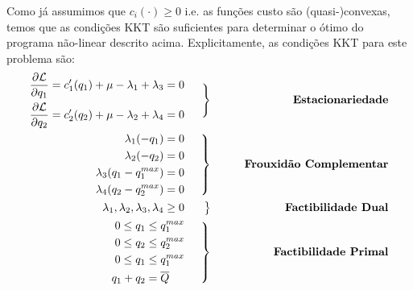 Como já assumimos que $c_i(\cdot)\ge0$ i.e. as funções custo são (quasi-)convexas, temos que as condições KKT são suficientes para determinar o ótimo do programa não-linear descrito acima. Explicitamente, as condições KKT para este problema são:
\begin{align*}
    \begin{aligned}
        \frac{\partial\mathcal{L}}{\partial q_1} &= c_1'(q_1) + \mu - \lambda_1 + \lambda_3 = 0\\
        \frac{\partial\mathcal{L}}{\partial q_2} &= c_2'(q_2) + \mu - \lambda_2 + \lambda_4 =0 
        \end{aligned} &&
        \left. \begin{aligned}
           \text{ }\\
           \text{ }
        \end{aligned}  \right\rbrace && \qquad \text{\textbf{Estacionariedade}}\\
        \begin{aligned}
            \lambda_1 (-q_1)&=0 \\
            \lambda_2 (-q_2)&=0 \\
            \lambda_3(q_1-q_1^{max})&=0\\
            \lambda_4(q_2-q_2^{max})&=0
        \end{aligned} &&
         \left. \begin{aligned}
           \text{ } \\
           \text{ } \\
           \text{ } \\
           \text{ } 
        \end{aligned}  \right\rbrace && \qquad \text{\textbf{Frouxidão Complementar}}\\
        \begin{aligned}
            \lambda_1,\lambda_2,\lambda_3,\lambda_4\ge0
        \end{aligned} &&
        \left. \begin{aligned}
           \text{ }
        \end{aligned}  \right\rbrace && \qquad \text{\textbf{Factibilidade Dual}}\\
        \begin{aligned}
            0\le q_1&\le q_1^{max}\\
            0\le q_2&\le q_2^{max}\\
            0\le q_1&\le q_1^{max}\\
            q_1+q_2&=\overline{Q}
        \end{aligned} && 
        \left. \begin{aligned}
           \text{ }\\
           \text{ }\\
           \text{ }\\
           \text{ } 
        \end{aligned}  \right\rbrace && \qquad \text{\textbf{Factibilidade Primal}}\\
\end{align*}
